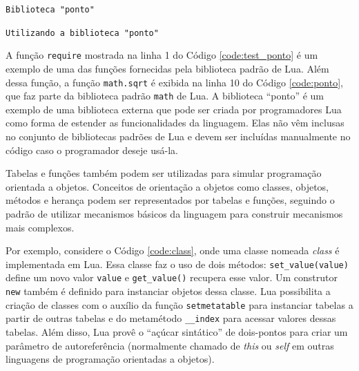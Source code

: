 \begin{center}
 \begin{minipage}{0.7\textwidth}
  \begin{codigo}[H]
   \small
   \caption{\texttt{Biblioteca "ponto"}}
   \label{code:ponto}
  \end{codigo}
 \end{minipage}
\end{center}

\begin{center}
 \begin{minipage}{0.7\textwidth}
  \begin{codigo}[H]
   \small
   \caption{\texttt{Utilizando a biblioteca "ponto"}}
   \label{code:test_ponto}
  \end{codigo}
 \end{minipage}
\end{center}

A função \verb|require| mostrada na linha 1 do Código \ref{code:test_ponto} é um exemplo de uma das funções fornecidas pela biblioteca padrão de Lua. Além dessa função, a função \verb|math.sqrt| é exibida na linha 10 do Código \ref{code:ponto}, que faz parte da biblioteca padrão \verb|math| de Lua. A biblioteca ``ponto'' é um exemplo de uma biblioteca externa que pode ser criada por programadores Lua como forma de estender as funcionalidades da linguagem. Elas não vêm inclusas no conjunto de bibliotecas padrões de Lua e devem ser incluídas manualmente no código caso o programador deseje usá-la.

Tabelas e funções também podem ser utilizadas para simular programação orientada a objetos. Conceitos de orientação a objetos como classes, objetos, métodos e herança podem ser representados por tabelas e funções, seguindo o padrão de utilizar mecanismos básicos da linguagem para construir mecanismos mais complexos.

Por exemplo, considere o Código \ref{code:class}, onde uma classe nomeada {\em class} é implementada em Lua. Essa classe faz o uso de dois métodos: \verb|set_value(value)| define um novo valor \verb|value| e \verb|get_value()| recupera esse valor. Um construtor \verb|new| também é definido para instanciar objetos dessa classe. Lua possibilita a criação de classes com o auxílio da função \verb|setmetatable| para instanciar tabelas a partir de outras tabelas e do metamétodo \verb|__index| para acessar valores dessas tabelas. Além disso, Lua provê o ``açúcar sintático'' de dois-pontos para criar um parâmetro de autoreferência (normalmente chamado de {\em this} ou {\em self} em outras linguagens de programação orientadas a objetos).

